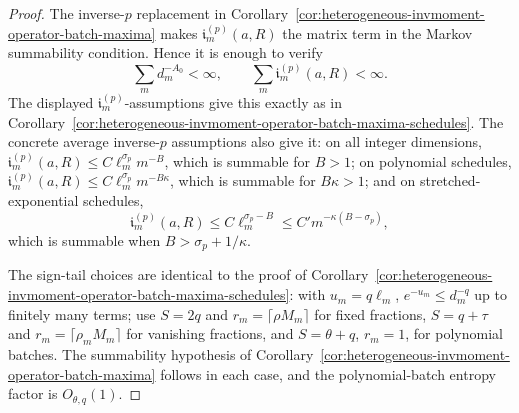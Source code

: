 \documentclass[11pt]{amsart}
\numberwithin{equation}{section}
\theoremstyle{definition}
\theoremstyle{remark}
\begin{document}
\begin{proof}
The inverse-\(p\) replacement in
Corollary~\ref{cor:heterogeneous-invmoment-operator-batch-maxima} makes
\(\mathfrak i_m^{(p)}(a,R)\) the matrix term in the Markov summability
condition.  Hence it is enough to verify
\[
  \sum_m d_m^{-A_0}<\infty,
  \qquad
  \sum_m\mathfrak i_m^{(p)}(a,R)<\infty .
\]
The displayed \(\mathfrak i_m^{(p)}\)-assumptions give this exactly as in
Corollary~\ref{cor:heterogeneous-invmoment-operator-batch-maxima-schedules}.
The concrete average inverse-\(p\) assumptions also give it: on all integer
dimensions,
\(\mathfrak i_m^{(p)}(a,R)\le C\ell_m^{\sigma_p}m^{-B}\), which is summable for
\(B>1\); on polynomial schedules,
\(\mathfrak i_m^{(p)}(a,R)\le C\ell_m^{\sigma_p}m^{-B\kappa}\), which is
summable for \(B\kappa>1\); and on stretched-exponential schedules,
\[
  \mathfrak i_m^{(p)}(a,R)\le C\ell_m^{\sigma_p-B}
  \le C'm^{-\kappa(B-\sigma_p)},
\]
which is summable when \(B>\sigma_p+1/\kappa\).

The sign-tail choices are identical to the proof of
Corollary~\ref{cor:heterogeneous-invmoment-operator-batch-maxima-schedules}:
with \(u_m=q\ell_m\), \(e^{-u_m}\le d_m^{-q}\) up to finitely many terms; use
\(S=2q\) and \(r_m=\lceil\rho M_m\rceil\) for fixed fractions,
\(S=q+\tau\) and \(r_m=\lceil\rho_mM_m\rceil\) for vanishing fractions, and
\(S=\theta+q\), \(r_m=1\), for polynomial batches.  The summability hypothesis
of Corollary~\ref{cor:heterogeneous-invmoment-operator-batch-maxima} follows in
each case, and the polynomial-batch entropy factor is \(O_{\theta,q}(1)\).
\end{proof}
\end{document}
